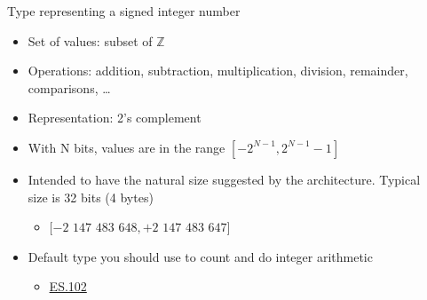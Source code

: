 \begin{frame}[fragile]{}

  \begin{columns}
    \begin{column}{.8\textwidth}
      Type representing a signed integer number

      \begin{itemize}
      \item<2-> Set of values: subset of $\mathbb{Z}$
      \item<3-> Operations: addition, subtraction, multiplication, division,
        remainder, comparisons, \ldots
      \item<4-> Representation: 2's complement
      \item<5-> With N bits, values are in the range $[-2^{N-1}, 2^{N-1}-1]$
      \item<6-> Intended to have the natural size suggested by the architecture.
        Typical size is 32 bits (4 bytes)
        \begin{itemize}
        \item $[-2$ $147$ $483$ $648, +2$ $147$ $483$ $647]$
        \end{itemize}
      \item<7-> Default type you should use to count and do integer arithmetic
        \begin{itemize}
        \item \href{https://isocpp.github.io/CppCoreGuidelines/CppCoreGuidelines#es102-use-signed-types-for-arithmetic}{ES.102}
        \end{itemize}
      \end{itemize}
    \end{column}
    \hfill
    \begin{column}{.2\textwidth}
    \end{column}
  \end{columns}

\end{frame}

